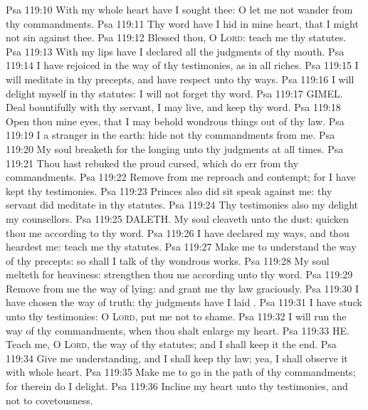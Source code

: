 \vs Psa 119:10 With my whole heart have I sought thee: O let me not wander from thy commandments.
\vs Psa 119:11 Thy word have I hid in mine heart, that I might not sin against thee.
\vs Psa 119:12 Blessed  thou, O \textsc{Lord}: teach me thy statutes.
\vs Psa 119:13 With my lips have I declared all the judgments of thy mouth.
\vs Psa 119:14 I have rejoiced in the way of thy testimonies, as  in all riches.
\vs Psa 119:15 I will meditate in thy precepts, and have respect unto thy ways.
\vs Psa 119:16 I will delight myself in thy statutes: I will not forget thy word.
\vs Psa 119:17 GIMEL. Deal bountifully with thy servant,  I may live, and keep thy word.
\vs Psa 119:18 Open thou mine eyes, that I may behold wondrous things out of thy law.
\vs Psa 119:19 I  a stranger in the earth: hide not thy commandments from me.
\vs Psa 119:20 My soul breaketh for the longing  unto thy judgments at all times.
\vs Psa 119:21 Thou hast rebuked the proud  cursed, which do err from thy commandments.
\vs Psa 119:22 Remove from me reproach and contempt; for I have kept thy testimonies.
\vs Psa 119:23 Princes also did sit  speak against me:  thy servant did meditate in thy statutes.
\vs Psa 119:24 Thy testimonies also  my delight  my counsellors.
\vs Psa 119:25 DALETH. My soul cleaveth unto the dust: quicken thou me according to thy word.
\vs Psa 119:26 I have declared my ways, and thou heardest me: teach me thy statutes.
\vs Psa 119:27 Make me to understand the way of thy precepts: so shall I talk of thy wondrous works.
\vs Psa 119:28 My soul melteth for heaviness: strengthen thou me according unto thy word.
\vs Psa 119:29 Remove from me the way of lying: and grant me thy law graciously.
\vs Psa 119:30 I have chosen the way of truth: thy judgments have I laid .
\vs Psa 119:31 I have stuck unto thy testimonies: O \textsc{Lord}, put me not to shame.
\vs Psa 119:32 I will run the way of thy commandments, when thou shalt enlarge my heart.
\vs Psa 119:33 HE. Teach me, O \textsc{Lord}, the way of thy statutes; and I shall keep it  the end.
\vs Psa 119:34 Give me understanding, and I shall keep thy law; yea, I shall observe it with  whole heart.
\vs Psa 119:35 Make me to go in the path of thy commandments; for therein do I delight.
\vs Psa 119:36 Incline my heart unto thy testimonies, and not to covetousness.
